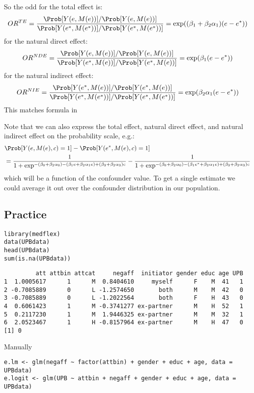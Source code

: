\documentclass[12pt]{article}
\begin{document}
So the odd for the total effect is:
\[ OR^{TE} = \frac{\Prob[Y(e,M(e))]/\Prob[Y(e,M(e))]}{\Prob[Y(e^*,M(e^*))]/\Prob[Y(e^*,M(e^*))]} = \exp( (\beta_1 + \beta_2 \alpha_1)(e-e^*)) \]
for the natural direct effect:
\[ OR^{NDE} = \frac{\Prob[Y(e,M(e))]/\Prob[Y(e,M(e))]}{\Prob[Y(e^*,M(e))]/\Prob[Y(e^*,M(e))]} = \exp(\beta_1(e-e^*)) \]
for the natural indirect effect:
\[ OR^{NIE} = \frac{\Prob[Y(e^*,M(e))]/\Prob[Y(e^*,M(e))]}{\Prob[Y(e^*,M(e^*))]/\Prob[Y(e^*,M(e^*))]} = \exp(\beta_2\alpha_1(e-e^*)) \]
This matches formula in \cite{vanderweele2010odds}


\bigskip


Note that we can also express the total effect, natural direct effect,
and natural indirect effect on the probability scale, e.g.:
\begin{align*}
&\Prob[Y(e,M(e),c)=1] - \Prob[Y(e^*,M(e),c)=1] \\
&= \frac{1}{1+\exp^{-(\beta_0+\beta_2 \alpha_0) - (\beta_1 e + \beta_2 \alpha_1 e) + (\beta_3 + \beta_2 \alpha_3) c}}
- \frac{1}{1+\exp^{-(\beta_0+\beta_2 \alpha_0) - (\beta_1 e^* + \beta_2 \alpha_1 e) + (\beta_3 + \beta_2 \alpha_3) c}}
\end{align*}
which will be a function of the confounder value. To get a single
estimate we could average it out over the confounder distribution in
our population.

\subsection{Practice}
\label{sec:org0bb8102}

\lstset{language=r,label= ,caption= ,captionpos=b,numbers=none}
\begin{lstlisting}
library(medflex)
data(UPBdata)
head(UPBdata)
sum(is.na(UPBdata))
\end{lstlisting}

\begin{verbatim}
         att attbin attcat     negaff  initiator gender educ age UPB
1  1.0005617      1      M  0.8404610     myself      F    M  41   1
2 -0.7085889      0      L -1.2574650       both      M    M  42   0
3 -0.7085889      0      L -1.2022564       both      F    H  43   0
4  0.6061423      1      M -0.3741277 ex-partner      M    H  52   1
5  0.2117230      1      M  1.9446325 ex-partner      M    M  32   1
6  2.0523467      1      H -0.8157964 ex-partner      M    H  47   0
[1] 0
\end{verbatim}


Manually
\lstset{language=r,label= ,caption= ,captionpos=b,numbers=none}
\begin{lstlisting}
e.lm <- glm(negaff ~ factor(attbin) + gender + educ + age, data = UPBdata)
e.logit <- glm(UPB ~ attbin + negaff + gender + educ + age, data = UPBdata)
\end{lstlisting}
\end{document}
